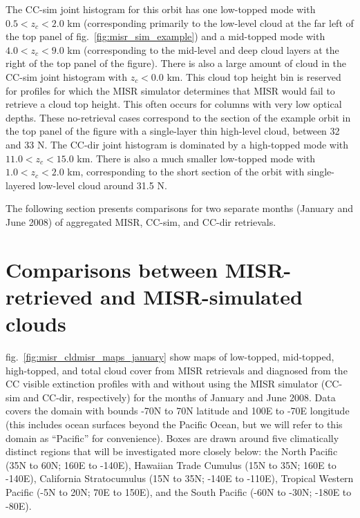 The CC-sim joint histogram for this orbit has one low-topped mode with
\(0.5 < z_c < 2.0\) km (corresponding primarily to the low-level cloud
at the far left of the top panel of fig.~\ref{fig:misr_sim_example}) and
a mid-topped mode with \(4.0 < z_c < 9.0\) km (corresponding to the
mid-level and deep cloud layers at the right of the top panel of the
figure). There is also a large amount of cloud in the CC-sim joint
histogram with \(z_c < 0.0\) km. This cloud top height bin is reserved
for profiles for which the MISR simulator determines that MISR would
fail to retrieve a cloud top height. This often occurs for columns with
very low optical depths. These no-retrieval cases correspond to the
section of the example orbit in the top panel of the figure with a
single-layer thin high-level cloud, between 32 and 33 N. The CC-dir
joint histogram is dominated by a high-topped mode with
\(11.0 < z_c < 15.0\) km. There is also a much smaller low-topped mode
with \(1.0 < z_c < 2.0\) km, corresponding to the short section of the
orbit with single-layered low-level cloud around 31.5 N.

The following section presents comparisons for two separate months
(January and June 2008) of aggregated MISR, CC-sim, and CC-dir
retrievals.

\section{Comparisons between MISR-retrieved and MISR-simulated
clouds}\label{sec:misrux5fresults}

fig.~\ref{fig:misr_cldmisr_maps_january} show maps of low-topped,
mid-topped, high-topped, and total cloud cover from MISR retrievals and
diagnosed from the CC visible extinction profiles with and without using
the MISR simulator (CC-sim and CC-dir, respectively) for the months of
January and June 2008. Data covers the domain with bounds -70N to 70N
latitude and 100E to -70E longitude (this includes ocean surfaces beyond
the Pacific Ocean, but we will refer to this domain as ``Pacific'' for
convenience). Boxes are drawn around five climatically distinct regions
that will be investigated more closely below: the North Pacific (35N to
60N; 160E to -140E), Hawaiian Trade Cumulus (15N to 35N; 160E to -140E),
California Stratocumulus (15N to 35N; -140E to -110E), Tropical Western
Pacific (-5N to 20N; 70E to 150E), and the South Pacific (-60N to -30N;
-180E to -80E).

